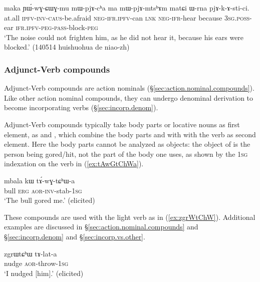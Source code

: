 \begin{exe}
\ex \label{ex:pjAkAstici}
\gll maka ɲɯ́-wɣ-ɕɯɣ-mu mɯ-pjɤ-cʰa ma mɯ-pjɤ-mtsʰɤm matɕi ɯ-rna pjɤ-k-ɤ-sti-ci. \\
at.all \textsc{ipfv}-\textsc{inv}-\textsc{caus}-be.afraid \textsc{neg}-\textsc{ifr}.\textsc{ipfv}-can \textsc{lnk} \textsc{neg}-\textsc{ifr}-hear because \textsc{3sg}.\textsc{poss}-ear \textsc{ifr}.\textsc{ipfv}-\textsc{peg}-\textsc{pass}-block-\textsc{peg} \\
\glt `The noise could not frighten him, as he did not hear it, because his ears were blocked.' (140514 huishuohua de niao-zh) 
\end{exe}

\subsubsection{Adjunct-Verb compounds} \label{sec:adjunct.verb.compounds}
Adjunct-Verb compounds are action nominals (§\ref{sec:action.nominal.compounds}). Like other action nominal compounds, they can undergo denominal derivation to become incorporating verbs (§\ref{sec:incorp.denom}). 

Adjunct-Verb compounds typically take body parts or locative nouns as first element, as  and , which combine the body parts  and  with with the verb  as second element. Here the body parts cannot be analyzed as objects: the object of  is the person being gored/hit, not the part of the body one uses, as shown by the \textsc{1sg} indexation on the verb in (\ref{ex:tAwGtChWa}).

\begin{exe}
\ex \label{ex:tAwGtChWa}
\gll mbala kɯ tɤ́-wɣ-tɕʰɯ-a \\
bull \textsc{erg} \textsc{aor}-\textsc{inv}-stab-\textsc{1sg} \\
\glt `The bull gored me.' (elicited)
\end{exe}

These compounds are used with the light verb  as in (\ref{ex:zgrWtChW}). Additional examples are discussed in §\ref{sec:action.nominal.compounds} and §\ref{sec:incorp.denom} and §\ref{sec:incorp.vs.other}.


\begin{exe}
\ex \label{ex:zgrWtChW}
\gll zgrɯtɕʰɯ tɤ-lat-a \\
nudge \textsc{aor}-throw-\textsc{1sg} \\
\glt `I nudged [him].' (elicited)
\end{exe}

